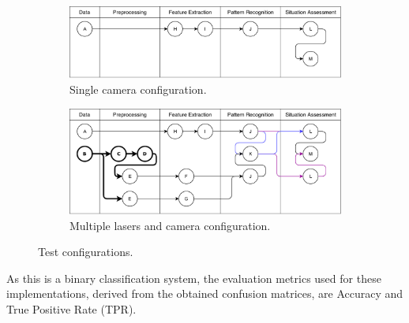\begin{figure}[ht!]

\begin{subfigure}{\textwidth}

\includegraphics[scale=0.6]{fig/4/test_configuration1.pdf}
\caption{Single camera configuration.}
\end{subfigure}


\begin{subfigure}{\textwidth}
\includegraphics[scale=0.6]{fig/4/test_configuration2.pdf}
\caption{Multiple lasers and camera configuration.}

\end{subfigure}
\caption{Test configurations.}
\label{tconf2}
\end{figure}

As this is a binary classification system, the evaluation metrics used for these implementations, derived from the obtained confusion matrices, are Accuracy and True Positive Rate (TPR).

%

